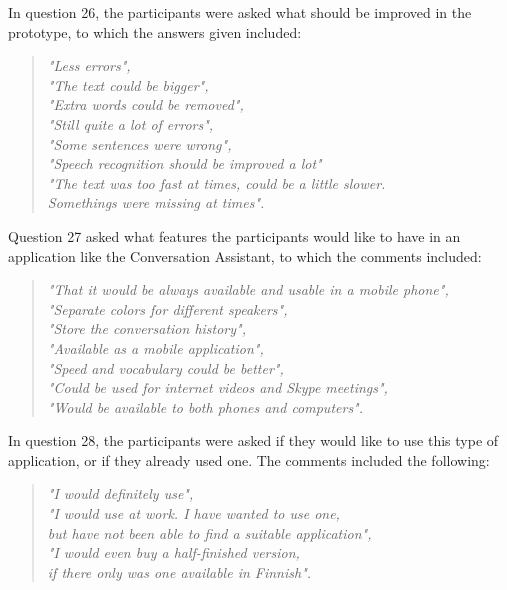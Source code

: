 \documentclass[english, 12pt, a4paper, pdftex, elec, utf8]{aaltothesis}
\renewcommand{\baselinestretch}{1.02}
\begin{document}
In question 26, the participants were asked what should be improved in the prototype, to which the answers given included:
\begin{quote}
    \centering
    \renewcommand{\baselinestretch}{1.4}
    \textit{
        "Less errors", \\
        "The text could be bigger", \\
        "Extra words could be removed", \\
        "Still quite a lot of errors", \\
        "Some sentences were wrong", \\
        "Speech recognition should be improved a lot" \\
        "The text was too fast at times, could be a little slower. \\ Somethings were missing at times".}
\end{quote}
\vspace{1mm}
Question 27 asked what features the participants would like to have in an application like the Conversation Assistant, to which the comments included:
\begin{quote}
    \centering
    \renewcommand{\baselinestretch}{1.4}
    \textit{
        "That it would be always available and usable in a mobile phone", \\
        "Separate colors for different speakers", \\
        "Store the conversation history", \\
        "Available as a mobile application", \\
        "Speed and vocabulary could be better", \\
        "Could be used for internet videos and Skype meetings", \\
        \vspace{2mm}
        "Would be available to both phones and computers".}
\end{quote}
\vspace{1mm}
In question 28, the participants were asked if they would like to use this type of application, or if they already used one. The comments included the following:
\begin{quote}
    \centering
    \renewcommand{\baselinestretch}{1.4}
    \textit{
        "I would definitely use", \\
        "I would use at work. I have wanted to use one, \\ \vspace{-2.5mm} but have not been able to find a suitable application", \\
        \vspace{2mm}
        "I would even buy a half-finished version, \\ if there only was one available in Finnish".}
\end{quote}
\end{document}
